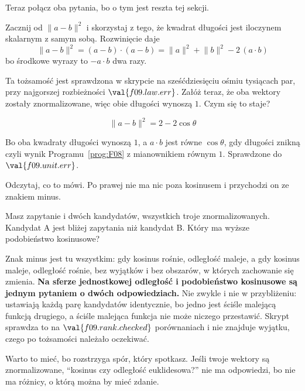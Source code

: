 \begin{fr}
Teraz połącz oba pytania, bo o tym jest reszta tej sekcji.

Zacznij od $\lVert a - b \rVert^{2}$ i skorzystaj z tego, że kwadrat długości
jest iloczynem skalarnym z samym sobą. Rozwinięcie daje
\[ \lVert a - b \rVert^{2} = (a - b) \cdot (a - b)
   = \lVert a \rVert^{2} + \lVert b \rVert^{2} - 2\,(a \cdot b) \]
bo środkowe wyrazy to $-a \cdot b$ dwa razy.

Ta tożsamość jest sprawdzona w skrypcie na sześćdziesięciu ośmiu tysiącach par,
przy najgorszej rozbieżności $\val{f09.law.err}$. Załóż teraz, że oba wektory
zostały znormalizowane, więc obie długości wynoszą $1$. Czym się to staje?
\nextframe
\end{fr}

\begin{fr}
\begin{ansblock}
\[ \lVert a - b \rVert^{2} = 2 - 2\cos\theta \]
\end{ansblock}

Bo oba kwadraty długości wynoszą $1$, a $a \cdot b$ jest równe $\cos\theta$,
gdy długości znikną \dash{} czyli wynik Programu~\ref{prog:F08} z mianownikiem
równym $1$. Sprawdzone do $\val{f09.unit.err}$.

Odczytaj, co to mówi. Po prawej nie ma nic poza kosinusem i przychodzi on ze
znakiem minus.

Masz zapytanie i dwóch kandydatów, wszystkich troje znormalizowanych. Kandydat
A jest bliżej zapytania niż kandydat B. Który ma wyższe podobieństwo
kosinusowe?
\dotline
\nextframe
\end{fr}

\begin{fr}
Znak minus jest tu wszystkim: gdy kosinus rośnie, odległość maleje, a gdy
kosinus maleje, odległość rośnie, bez wyjątków i bez obszarów, w których
zachowanie się zmienia. \textbf{Na sferze jednostkowej odległość i
podobieństwo kosinusowe są jednym pytaniem o dwóch odpowiedziach.} Nie zwykle i
nie w przybliżeniu: ustawiają
każdą parę kandydatów identycznie, bo jedno jest ściśle malejącą funkcją
drugiego, a ściśle malejąca funkcja nie może niczego przestawić. Skrypt
sprawdza to na $\val{f09.rank.checked}$ porównaniach i nie znajduje wyjątku,
czego po tożsamości należało oczekiwać.

Warto to mieć, bo rozstrzyga spór, który spotkasz. Jeśli twoje wektory są
znormalizowane, \enquote{kosinus czy odległość euklidesowa?} nie ma
odpowiedzi, bo nie ma różnicy, o którą można by mieć zdanie.

\end{fr}

